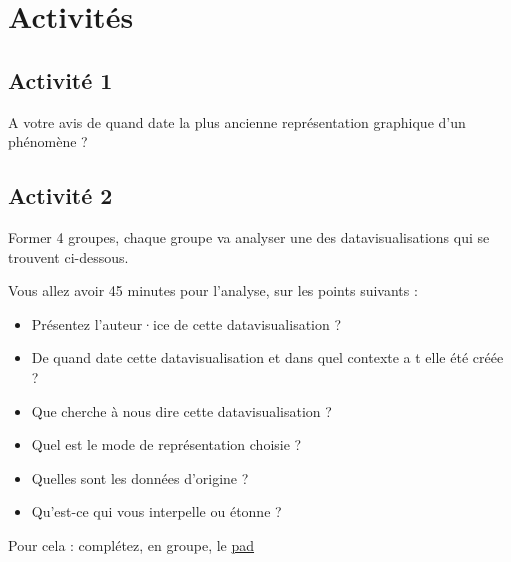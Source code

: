 \documentclass[
  letterpaper,
  DIV=11,
  numbers=noendperiod]{scrreprt}
\begin{document}
\hypertarget{activituxe9s}{%
\section{Activités}\label{activituxe9s}}

\hypertarget{activituxe9-1}{%
\subsection{Activité 1}\label{activituxe9-1}}

A votre avis de quand date la plus ancienne représentation graphique
d'un phénomène ?

\hypertarget{activituxe9-2}{%
\subsection{Activité 2}\label{activituxe9-2}}

Former 4 groupes, chaque groupe va analyser une des datavisualisations
qui se trouvent ci-dessous.

Vous allez avoir 45 minutes pour l'analyse, sur les points suivants :

\begin{itemize}
\item
  Présentez l'auteur·ice de cette datavisualisation ?
\item
  De quand date cette datavisualisation et dans quel contexte a t elle
  été créée ?
\item
  Que cherche à nous dire cette datavisualisation ?
\item
  Quel est le mode de représentation choisie ?
\item
  Quelles sont les données d'origine ?
\item
  Qu'est-ce qui vous interpelle ou étonne ?
\end{itemize}

Pour cela : complétez, en groupe, le
\href{https://digipad.app/p/619238/1ccf04fb11e13}{pad}
\end{document}
